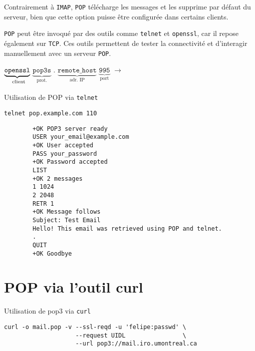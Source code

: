 \documentclass[a4paper]{report}
\begin{document}
    Contrairement à \texttt{IMAP}, \texttt{POP} télécharge les messages et 
    les supprime par défaut du serveur, bien que cette option puisse être 
    configurée dans certains clients.

    \texttt{POP} peut être invoqué par des outils comme \texttt{telnet} et 
    \texttt{openssl}, car il repose également sur \texttt{TCP}. Ces outils 
    permettent de tester la connectivité et d'interagir manuellement avec un 
    serveur \texttt{POP}.     

    \begin{center}
        \( \underbrace{\texttt{openssl}}_{\text{\phantom{p}client}}  \)
        \( \underbrace{\texttt{pop3s}}_{\text{prot.}}  \)
        .
        \( \underbrace{\texttt{remote\_host}}_{\text{adr. IP}}  \)
        \( \underbrace{\texttt{995}}_{\text{port}}  \)
        $\longrightarrow$
    \end{center}

    \begin{EExample}{Utilisation de POP via \texttt{telnet}}{}
        \begin{center}
         \texttt{telnet pop.example.com 110}  
        \begin{lstlisting}
        +OK POP3 server ready
        USER your_email@example.com
        +OK User accepted
        PASS your_password
        +OK Password accepted
        LIST
        +OK 2 messages
        1 1024
        2 2048
        RETR 1
        +OK Message follows
        Subject: Test Email
        Hello! This email was retrieved using POP and telnet.
        .
        QUIT
        +OK Goodbye
        \end{lstlisting} 
        \hyperlink{Utilisation de POP via telnet}{
                }           
        \end{center}

    \end{EExample}


    \section{POP via l'outil curl}


    \begin{EExample}{Utilisation de pop3 via \texttt{curl}}{}
        \begin{center}
            \begin{lstlisting}
curl -o mail.pop -v --ssl-reqd -u 'felipe:passwd' \
                    --request UIDL                \ 
                    --url pop3://mail.iro.umontreal.ca
            \end{lstlisting}
        
        \hyperlink{Utilisation de op3 via curl}{
                }   
        \end{center}
    \end{EExample}
\end{document}

